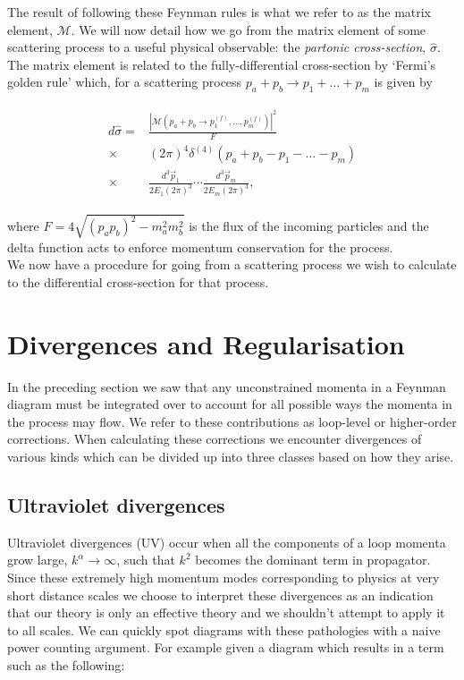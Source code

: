 	The result of following these Feynman rules is what we refer to as the matrix element, $\mathcal{M}$.  We will now detail how
	we go from the matrix element of some scattering process to a useful physical observable: the \emph{partonic cross-section},
	$\hat{\sigma}$.  The matrix element is related to the fully-differential cross-section by `Fermi's golden rule' which, for
	a scattering process $p_{a} + p_{b}\rightarrow p_{1} + \ldots + p_{m}$ is given by

	\begin{align}
	\begin{split}
		d\hat{\sigma} = &\frac{|\mathcal{M}(p_{a} + p_{b}\rightarrow p_{1}^{(f)}, \ldots, p_{m}^{(f)})|^2}{F}\\
		\times&(2\pi)^4\delta^{(4)}(p_{a} + p_{b} - p_{1} - \ldots - p_{m}) \\
		\times&\frac{d^3\vec{p}_1}{2E_1(2\pi)^3}\cdots\frac{d^3\vec{p}_m}{2E_m(2\pi)^3},
	\end{split}
	\end{align}

	where $F=4\sqrt{(p_ap_b)^2 - m_a^2m_b^2}$ is the flux of the incoming particles and the delta function acts to
	enforce momentum conservation for the process.\\We now have a procedure for going from a scattering process
	we wish to calculate to the differential cross-section for that process.

\section{Divergences and Regularisation}
	\label{sec:divAndReg}

	In the preceding section we saw that any unconstrained momenta in a Feynman diagram must be integrated over to account
	for all possible ways the momenta in the process may flow.  We refer to these contributions as loop-level or
	higher-order corrections.  When calculating these corrections we encounter divergences of various kinds which can be
	divided up into three classes based on how they arise.

	\subsection{Ultraviolet divergences}

		Ultraviolet divergences (UV) occur when all the components of a loop momenta grow large,
		$k^\alpha\rightarrow\infty$, such that $k^2$ becomes the dominant term in propagator.
		Since these extremely high momentum modes corresponding to physics at very short distance scales
		we choose to interpret these divergences as an indication that our theory is only an effective
		theory and we shouldn't attempt to apply it to all scales.  We can quickly spot diagrams with these
		pathologies with a naive power counting argument.  For example given a diagram which results in a
		term such as the following:


